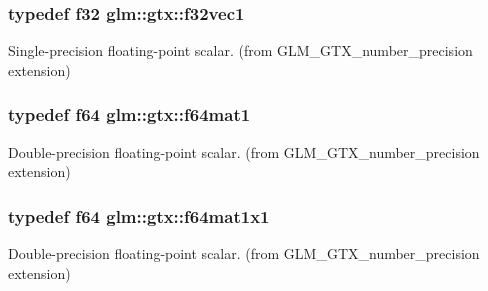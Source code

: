 \subsubsection[{f32vec1}]{\setlength{\rightskip}{0pt plus 5cm}typedef f32 {\bf glm\+::gtx\+::f32vec1}}\label{group__gtx__number__precision_gadab8e598b0b4697629482682bdb7f223}


Single-\/precision floating-\/point scalar. (from G\+L\+M\+\_\+\+G\+T\+X\+\_\+number\+\_\+precision extension) 

\hypertarget{group__gtx__number__precision_ga23f8f53c78b50aa07a113c3d07d01bc9}{}
\subsubsection[{f64mat1}]{\setlength{\rightskip}{0pt plus 5cm}typedef f64 {\bf glm\+::gtx\+::f64mat1}}\label{group__gtx__number__precision_ga23f8f53c78b50aa07a113c3d07d01bc9}


Double-\/precision floating-\/point scalar. (from G\+L\+M\+\_\+\+G\+T\+X\+\_\+number\+\_\+precision extension) 

\hypertarget{group__gtx__number__precision_ga710a5952d78b22635c71c5fc2c0a3319}{}
\subsubsection[{f64mat1x1}]{\setlength{\rightskip}{0pt plus 5cm}typedef f64 {\bf glm\+::gtx\+::f64mat1x1}}\label{group__gtx__number__precision_ga710a5952d78b22635c71c5fc2c0a3319}


Double-\/precision floating-\/point scalar. (from G\+L\+M\+\_\+\+G\+T\+X\+\_\+number\+\_\+precision extension) 

\hypertarget{group__gtx__number__precision_ga44336a26c958d66efdfb5a6c114c538e}{}
